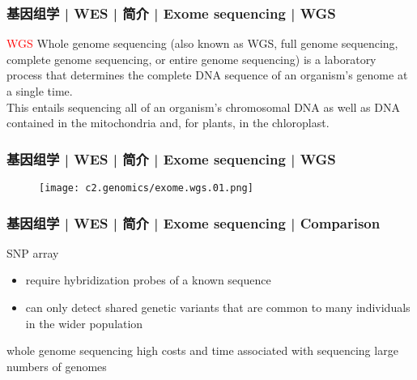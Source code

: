 \begin{frame}
  \frametitle{基因组学 | WES | 简介 | Exome sequencing | WGS}
  \begin{block}{\textcolor{red}{WGS}}
    Whole genome sequencing (also known as WGS, full genome sequencing, complete genome sequencing, or entire genome sequencing) is a laboratory process that determines the complete DNA sequence of an organism's genome at a single time.\\
    \vspace{1em}
    This entails sequencing all of an organism's chromosomal DNA as well as DNA contained in the mitochondria and, for plants, in the chloroplast.
  \end{block}
\end{frame}

\begin{frame}
  \frametitle{基因组学 | WES | 简介 | Exome sequencing | WGS}
  \begin{figure}
    \centering
    \texttt{[image: c2.genomics/exome.wgs.01.png]}
  \end{figure}
\end{frame}

\begin{frame}
  \frametitle{基因组学 | WES | 简介 | Exome sequencing | Comparison}
  \begin{block}{SNP array}
    \begin{itemize}
      \item require hybridization probes of a known sequence
      \item can only detect shared genetic variants that are common to many individuals in the wider population
    \end{itemize}
  \end{block}
  \pause
  \begin{block}{whole genome sequencing}
    high costs and time associated with sequencing large numbers of genomes
  \end{block}
\end{frame}

